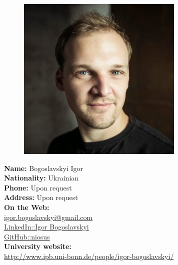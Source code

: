 \documentclass[a4paper,12pt,final]{memoir}
\newcommand{\Sep}{\vspace{1.5em}}
\newcommand{\SmallSep}{\vspace{0.5em}}
\begin{document}
\begin{figure}
	\hfill
	\includegraphics[width=\columnwidth]{igor.jpg}
	\vspace{-5cm}
\end{figure}

\begin{flushleft}\small
	\textbf{Name:} Bogoslavskyi Igor\\
	\SmallSep
	\textbf{Nationality:} Ukrainian\\
	\SmallSep
	\textbf{Phone:} Upon request \\
	\SmallSep
	\textbf{Address:} Upon request \\
	\Sep
	\textbf{On the Web:}\\
	\SmallSep
	\href{mailto:igor.bogoslavskyi@gmail.com}{igor.bogoslavskyi@gmail.com}\\
	\SmallSep
	\href{https://de.linkedin.com/in/igor-bogoslavskyi-72650b43}{LinkedIn::Igor Bogoslavskyi}\\
	\SmallSep
	\href{https://github.com/niosus}{GitHub::niosus}\\
	\SmallSep
	\textbf{University website:}\\
	\SmallSep
	\url{http://www.ipb.uni-bonn.de/people/igor-bogoslavskyi/}\\
\end{flushleft}
\normalsize
\end{document}
